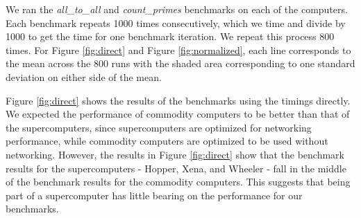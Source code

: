 \documentclass{article}
\begin{document}
We ran the \textit{all\_to\_all} and \textit{count\_primes} benchmarks on each of the computers. Each benchmark repeats 1000 times consecutively, which we time and divide by 1000 to get the time for one benchmark iteration. We repeat this process 800 times. For Figure \ref{fig:direct} and Figure \ref{fig:normalized}, each line corresponds to the mean across the 800 runs with the shaded area corresponding to one standard deviation on either side of the mean.

Figure \ref{fig:direct} shows the results of the benchmarks using the timings directly. We expected the performance of commodity computers to be better than that of the supercomputers, since supercomputers are optimized for networking performance, while commodity computers are optimized to be used without networking. However, the results in Figure \ref{fig:direct} show that the benchmark results for the supercomputers - Hopper, Xena, and Wheeler - fall in the middle of the benchmark results for the commodity computers. This suggests that being part of a supercomputer has little bearing on the performance for our benchmarks.
\end{document}
